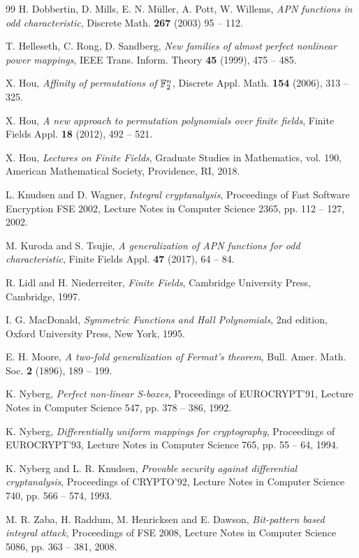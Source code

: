 \documentclass{amsart}
\numberwithin{equation}{section}
\theoremstyle{definition}
\begin{document}
\begin{thebibliography}{99}
H. Dobbertin, D. Mills, E. N. M\"uller, A. Pott, W. Willems, {\it APN functions in odd characteristic}, Discrete Math. {\bf 267} (2003) 95 -- 112.

T. Helleseth, C. Rong, D. Sandberg, {\it New families of almost perfect nonlinear power mappings}, IEEE Trans. Inform. Theory {\bf 45} (1999), 475 -- 485.


X. Hou, {\it Affinity of permutations of ${\Bbb F}_2^n$}, Discrete Appl.  Math. {\bf 154} (2006), 313 -- 325. 

X. Hou, {\it A new approach to permutation polynomials over finite fields}, Finite Fields Appl. {\bf 18} (2012), 492 -- 521.

X. Hou, {\it Lectures on Finite Fields}, Graduate Studies in Mathematics, vol. 190, American Mathematical Society, Providence, RI, 2018.

L. Knudsen and D. Wagner, {\it Integral cryptanalysis}, Proceedings of Fast Software Encryption FSE 2002, Lecture Notes in Computer Science 2365, pp. 112 -- 127,
2002.

M. Kuroda and S. Tsujie, {\it A generalization of APN functions for odd characteristic}, Finite Fields Appl. {\bf 47} (2017), 64 -- 84.

 R. Lidl and H. Niederreiter, {\it Finite Fields},  Cambridge University Press, Cambridge, 1997.

I. G. MacDonald, {\it Symmetric Functions and Hall Polynomials}, 2nd edition, 
Oxford University Press, New York, 1995.

E. H. Moore, {\it A two-fold generalization of Fermat's theorem}, Bull. Amer. Math. Soc. {\bf 2} (1896), 189 -- 199.

K. Nyberg, {\it Perfect non-linear S-boxes}, Proceedings of EUROCRYPT’91, Lecture Notes in Computer Science 547, pp. 378 -- 386, 1992.

K. Nyberg, {\it Differentially uniform mappings for cryptography}, Proceedings of EUROCRYPT’93, Lecture Notes in Computer Science 765, pp. 55 -- 64, 1994.

K. Nyberg and L. R. Knudsen, {\it Provable security against differential cryptanalysis}, Proceedings of CRYPTO’92, Lecture Notes in Computer Science 740, pp. 566 -- 574,
1993.

M. R. Zaba, H. Raddum, M. Henricksen and E. Dawson, {\it Bit-pattern based integral attack}, Proceedings of FSE 2008, Lecture Notes in Computer Science 5086, pp.
363 -- 381, 2008.

\end{thebibliography}

\end{document}
